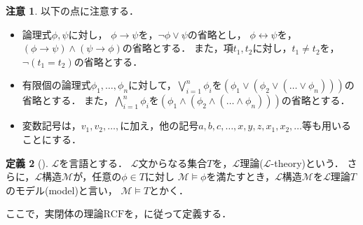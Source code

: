 \documentclass[uplatex, dvipdfmx]{jsarticle}
\numberwithin{equation}{section}
\newcommand{\RCF}{\mathrm{RCF}}
\theoremstyle{definition}
\newtheorem{definition}{定義}[section]
\newtheorem{remark}[definition]{注意}
\begin{document}
\begin{remark}
     以下の点に注意する．

     \begin{itemize}
          \item
               論理式$\phi, \psi$に対し，
               $\phi \rightarrow \psi$を，$\lnot \phi \lor \psi$の省略とし，
               $\phi \leftrightarrow \psi$を，$(\phi \rightarrow \psi)\land(\psi \rightarrow \phi)$の省略とする．
               また，項$t_1, t_2$に対し，$t_1 \neq t_2$を，$\lnot(t_1 = t_2)$の省略とする．
          \item
               有限個の論理式$\phi_1, \dots, \phi_n$に対して，$\bigvee_{i=1}^n \phi_i$を$(\phi_1 \lor (\phi_2 \lor (\dots \lor \phi_n)))$の省略とする．
               また，$\bigwedge_{i=1}^n \phi_i$を$(\phi_1 \land (\phi_2 \land (\dots \land \phi_n)))$の省略とする．
          \item     
               変数記号は，$v_1, v_2, \dots, $に加え，他の記号$a, b, c, \dots, x, y, z, x_1, x_2, \dots$等も用いることにする．
          \end{itemize}
\end{remark}


\begin{definition}[{\cite[Section 1.2]{MR1924282}}]
     $\mathcal{L}$を言語とする．
     $\mathcal{L}$文からなる集合$T$を，$\mathcal{L}$理論($\mathcal{L}$-theory)という．
     さらに，$\mathcal{L}$構造$\mathcal{M}$が，任意の$\phi \in T$に対し
     $\mathcal{M} \models \phi$を満たすとき，$\mathcal{L}$構造$\mathcal{M}$を$\mathcal{L}$理論$T$のモデル(model)と言い，
     $\mathcal{M} \models T$とかく．
\end{definition}

ここで，実閉体の理論$\RCF$を，\cite[Section 5.2.1]{C3041}に従って定義する．
\end{document}
